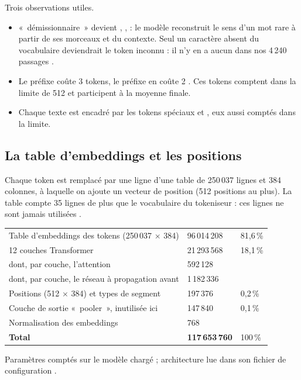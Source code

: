 Trois observations utiles.
\begin{itemize}
\item «~démissionnaire~» devient , ,  : le modèle reconstruit le sens d'un mot
  rare à partir de ses morceaux et du contexte. Seul un caractère absent du vocabulaire deviendrait le
  token inconnu  : il n'y en a aucun dans nos 4\,240 passages \mesure.
\item Le préfixe  coûte 3 tokens, le préfixe  en coûte 2 \mesure. Ces tokens comptent
  dans la limite de 512 et participent à la moyenne finale.
\item Chaque texte est encadré par les tokens spéciaux  et , eux aussi comptés dans la limite.
\end{itemize}

\subsection{La table d'embeddings et les positions}

Chaque token est remplacé par une ligne d'une table de 250\,037 lignes et 384 colonnes, à laquelle on ajoute un
vecteur de position (512 positions au plus). La table compte 35 lignes de plus que le vocabulaire du tokeniseur :
ces lignes ne sont jamais utilisées \mesure.

\begin{tabletype}
\begin{tabularx}{\textwidth}{@{}YR{3.2cm}R{2.2cm}@{}}
\toprule
{} &  &  \\
\midrule
Table d'embeddings des tokens (250\,037 $\times$ 384) & 96\,014\,208 & 81,6\,\% \\
12 couches Transformer & 21\,293\,568 & 18,1\,\% \\
\quad dont, par couche, l'attention & 592\,128 & \\
\quad dont, par couche, le réseau à propagation avant & 1\,182\,336 & \\
Positions (512 $\times$ 384) et types de segment & 197\,376 & 0,2\,\% \\
Couche de sortie «~pooler~», inutilisée ici & 147\,840 & 0,1\,\% \\
Normalisation des embeddings & 768 & \\
\midrule
\textbf{Total} & \textbf{117\,653\,760} & 100\,\% \\
\bottomrule
\end{tabularx}
\end{tabletype}
{\sffamily\scriptsize\color{gris} Paramètres comptés sur le modèle chargé \mesure ; architecture lue dans son fichier de configuration \source.}

